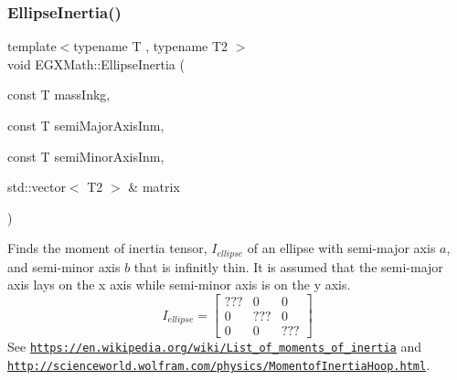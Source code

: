 \mbox{\label{group___e_g_x_math-_geometry-2_d-_ellipse-_inertia_ga4d9a8fec47d22c25481db36bf475905a}} 
\subsubsection{\texorpdfstring{Ellipse\+Inertia()}{EllipseInertia()}\hspace{0.1cm}{\footnotesize\ttfamily [2/3]}}
{\footnotesize\ttfamily template$<$typename T , typename T2 $>$ \\
void E\+G\+X\+Math\+::\+Ellipse\+Inertia (\begin{DoxyParamCaption}\item[{const T}]{mass\+Inkg,  }\item[{const T}]{semi\+Major\+Axis\+Inm,  }\item[{const T}]{semi\+Minor\+Axis\+Inm,  }\item[{std\+::vector$<$ T2 $>$ \&}]{matrix }\end{DoxyParamCaption})}



Finds the moment of inertia tensor, $I_{ellipse}$ of an ellipse with semi-\/major axis $a$, and semi-\/minor axis $b$ that is infinitly thin. It is assumed that the semi-\/major axis lays on the x axis while semi-\/minor axis is on the y axis. \[ I_{ellipse}=\begin{bmatrix} ??? & 0 & 0\\ 0 & ??? & 0\\ 0 & 0 & ??? \end{bmatrix} \] See \href{https://en.wikipedia.org/wiki/List_of_moments_of_inertia}{\tt https\+://en.\+wikipedia.\+org/wiki/\+List\+\_\+of\+\_\+moments\+\_\+of\+\_\+inertia} and \href{http://scienceworld.wolfram.com/physics/MomentofInertiaHoop.html}{\tt http\+://scienceworld.\+wolfram.\+com/physics/\+Momentof\+Inertia\+Hoop.\+html}. 


